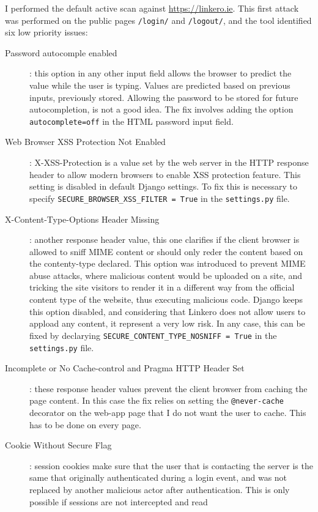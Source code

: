 I performed the default active scan against \url{https://linkero.ie}. This
first attack was performed on the public pages \texttt{/login/} and
\texttt{/logout/}, and the tool identified six low priority issues:
\begin{description}
  \item[Password autocomple enabled]: this option in any other input field
  allows the browser to predict the value while the user is typing. Values are
  predicted based on previous inputs, previously stored. Allowing the password
  to be stored for future autocompletion, is not a good idea. The fix involves
  adding the option \texttt{autocomplete=off} in the HTML password input field.
  \item[Web Browser XSS Protection Not Enabled]: X-XSS-Protection is a
  value set by the web server in the HTTP response header to allow modern
  browsers to enable XSS protection feature. This setting is disabled in default
  Django settings. To fix this is necessary to specify
  \texttt{SECURE\_BROWSER\_XSS\_FILTER = True} in the \texttt{settings.py} file.
  \item[X-Content-Type-Options Header Missing]: another response header value,
  this one clarifies if the client browser is allowed to sniff MIME content or
  should only reder the content based on the contenty-type declared. This option
  was introduced to prevent MIME abuse attacks, where malicious content would be
  uploaded on a site, and tricking the site visitors to render it in a different
  way from the official content type of the website, thus executing
  malicious code. Django keeps this option disabled, and considering that
  Linkero does not allow users to appload any content, it represent a very low
  risk. In any case, this can be fixed by declarying
  \texttt{SECURE\_CONTENT\_TYPE\_NOSNIFF = True} in the \texttt{settings.py}
  file.
  \item[Incomplete or No Cache-control and Pragma HTTP Header Set]: these
  response header values prevent the client browser from caching the page
  content. In this case the fix relies on setting the \texttt{@never-cache}
  decorator on the web-app page that I do not want the user to cache. This has
  to be done on every page.
  \item[Cookie Without Secure Flag]: session cookies make sure that the user
  that is contacting the server is the same that originally authenticated during
  a login event, and was not replaced by another malicious actor after
  authentication. This is only possible if sessions are not intercepted and read

\end{description}
